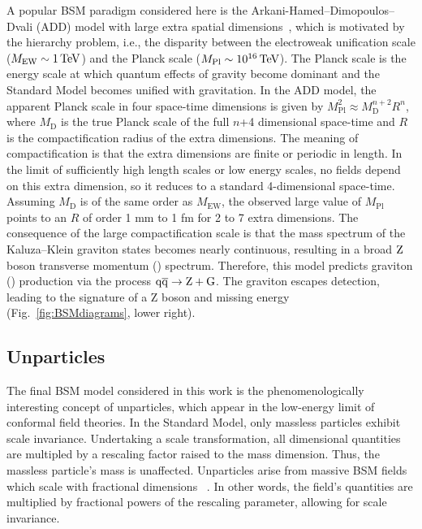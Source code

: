 A popular BSM paradigm considered here is the Arkani-Hamed--Dimopoulos--Dvali (ADD) model with large extra spatial dimensions~\cite{arkani98:hlz,arkani99:hlz,han99:hlz}, which
is motivated by the hierarchy problem, i.e., the disparity between the electroweak unification
scale ($M_\mathrm{EW} \sim 1\,\text{Te\hspace{-.08em}V}$) and the Planck scale ($M_\mathrm{Pl} \sim 10^{16}\,\text{Te\hspace{-.08em}V}$).
The Planck scale is the energy scale at which quantum effects of gravity become dominant and the Standard Model becomes unified with gravitation.
In the ADD model, the apparent Planck scale in four space-time dimensions
is given by $M_\mathrm{Pl}^2 \approx M_\mathrm{D}^{n+2}R^n$, where $M_\mathrm{D}$ is the true Planck scale of
the full $n$+4 dimensional space-time and $R$ is the compactification radius of the extra
dimensions.
The meaning of compactification is that the extra dimensions are finite or periodic in length.
In the limit of sufficiently high length scales or low energy scales, no fields depend on this extra dimension, so it reduces to a standard 4-dimensional space-time.
Assuming $M_\mathrm{D}$ is of the same order as $M_\mathrm{EW}$, the observed large value
of $M_\mathrm{Pl}$ points to an $R$ of order 1 mm to 1 fm for 2 to 7 extra dimensions.
The consequence of the large compactification scale is that the mass spectrum of the
Kaluza--Klein graviton states becomes nearly continuous, resulting in a broad $\mathrm{Z}$ boson transverse momentum (\PT) spectrum.
Therefore, this model predicts graviton (\cPG) production via the process $\mathrm{q}\overline{\mathrm{q}} \rightarrow \mathrm{Z} + \mathrm{G}$.
The graviton escapes detection, leading to the signature of a Z boson and missing energy (Fig.~\ref{fig:BSMdiagrams}, lower right).

\subsection{Unparticles}

The final BSM model considered in this work is the phenomenologically interesting concept of unparticles, which appear in the low-energy limit of conformal field theories.
In the Standard Model, only massless particles exhibit scale invariance.
Undertaking a scale transformation, all dimensional quantities are multipled by a rescaling factor
raised to the mass dimension. Thus, the massless particle's mass is unaffected.
Unparticles arise from massive BSM fields which scale with fractional dimensions ~\cite{Kang:2014cia,Rinaldi:2014gha,Cheng:1988zx}. 
In other words, the field's quantities are multiplied by fractional powers of the rescaling parameter, allowing for scale invariance.


